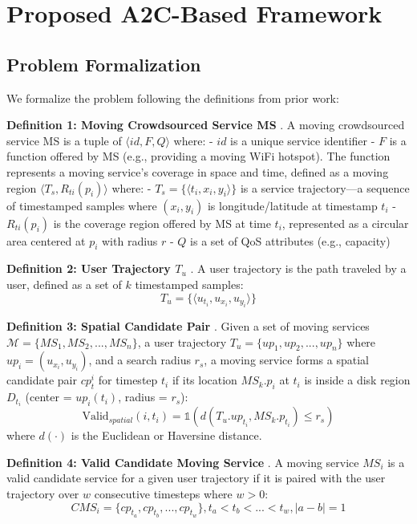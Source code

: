 \documentclass[10pt,twocolumn]{article}
\begin{document}
\section{Proposed A2C-Based Framework}\label{proposed-a2c-based-framework}

\subsection{Problem Formalization}\label{problem-formalization}

We formalize the problem following the definitions from prior work:

\textbf{Definition 1: Moving Crowdsourced Service MS} \cite{neiat2021}. A moving
crowdsourced service MS is a tuple of \(\langle id, F, Q \rangle\)
where: - \(id\) is a unique service identifier - \(F\) is a function
offered by MS (e.g., providing a moving WiFi hotspot). The function
represents a moving service's coverage in space and time, defined as a
moving region \(\langle T_s, R_{ti}(p_i) \rangle\) where: -
\(T_s = \{\langle t_i, x_i, y_i \rangle\}\) is a service trajectory---a
sequence of timestamped samples where \((x_i, y_i)\) is
longitude/latitude at timestamp \(t_i\) - \(R_{ti}(p_i)\) is the
coverage region offered by MS at time \(t_i\), represented as a circular
area centered at \(p_i\) with radius \(r\) - \(Q\) is a set of QoS
attributes (e.g., capacity)

\textbf{Definition 2: User Trajectory \(T_u\)} \cite{neiat2021}. A user trajectory is the
path traveled by a user, defined as a set of \(k\) timestamped samples:
\[T_u = \{\langle u_{t_i}, u_{x_i}, u_{y_i} \rangle\}\]

\textbf{Definition 3: Spatial Candidate Pair} \cite{neiat2021}. Given a set of moving
services \(\mathcal{M} = \{MS_1, MS_2, ..., MS_n\}\), a user trajectory
\(T_u = \{up_1, up_2, ..., up_n\}\) where \(up_i = (u_{x_i}, u_{y_i})\),
and a search radius \(r_s\), a moving service forms a spatial candidate
pair \(cp_t^i\) for timestep \(t_i\) if its location \(MS_k.p_i\) at
\(t_i\) is inside a disk region \(D_{t_i}\) (center = \(up_i(t_i)\),
radius = \(r_s\)):
\[\text{Valid}_{spatial}(i, t_i) = \mathbb{1}(d(T_u.up_{t_i}, MS_k.p_{t_i}) \leq r_s)\]
where \(d(\cdot)\) is the Euclidean or Haversine distance.

\textbf{Definition 4: Valid Candidate Moving Service} \cite{neiat2021}. A moving service
\(MS_i\) is a valid candidate service for a given user trajectory if it
is paired with the user trajectory over \(w\) consecutive timesteps
where \(w > 0\):
\[CMS_i = \{cp_{t_a}, cp_{t_b}, ..., cp_{t_w}\}, t_a < t_b < ... < t_w, |a - b| = 1\]
\end{document}
